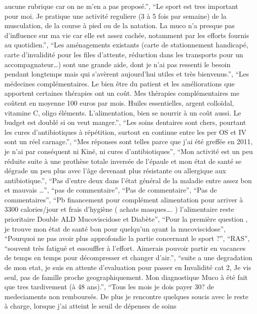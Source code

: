 \documentclass[
  letterpaper,
  DIV=11,
  numbers=noendperiod]{scrartcl}
\begin{document}
\begin{itemize}
  aucune rubrique car on ne m'en a pas proposé.'', ``Le sport est tres
  important pour moi. Je pratique une activité reguliere (3 à 5 fois par
  semaine) de la musculation, de la course à pied ou de la natation. La
  muco n'a presque pas d'influence sur ma vie car elle est assez cachée,
  notamment par les efforts fournis au quotidien.'', ``Les aménagements
  existants (carte de stationnement handicapé, carte d'invalidité pour
  les files d'attente, réduction dans les transports pour un
  accompagnateur\ldots) sont une grande aide, dont je n'ai pas ressenti
  le besoin pendant longtemps mais qui s'avèrent aujourd'hui utiles et
  très bienvenus.'', ``Les médecines complémentaires. Le bien être du
  patient et les améliorations que apportent certaines thérapies ont un
  coût. Mes thérapies complémentaires me coûtent en moyenne 100 euros
  par mois. Huiles essentielles, argent colloïdal, vitamine C, oligo
  éléments. L'alimentation, bien se nourrir à un coût aussi. Le budget
  est doublé si on veut manger.'', ``Les soins dentaires sont chers,
  pourtant les cures d'antibiotiques à répétition, surtout en continue
  entre les per OS et IV sont un réel carnage.'', ``Mes réponses sont
  telles parce que j'ai été greffée en 2011, je n'ai par conséquent ni
  Kiné, ni cures d'antibiotiques'', ``Mon activité est un peu réduite
  suite à une prothèse totale inversée de l'épaule et mon état de santé
  se dégrade un peu plus avec l'âge devenant plus résistante ou
  allergique aux antibiotique.'', ``Pas d'entre deux dans l'état général
  de la maladie entre assez bon et mauvais \ldots{}'', ``pas de
  commentaire'', ``Pas de commentaire'', ``Pas de commentaires'', ``Pb
  financement pour complément alimentation pour arriver à 3300
  calories/jour et frais d'hygiène ( achats masques\ldots. )
  l'alimentaire reste prioritaire Double ALD Mucoviscidose et Diabète'',
  ``Pour la première question , je trouve mon état de santé bon pour
  quelqu'un ayant la mucoviscidose'', ``Pourquoi ne pas avoir plus
  approfondie la partie concernant le sport ?'', ``RAS'', ``souvent très
  fatigué et essouffler à l'effort. Aimerais pouvoir partir en vacances
  de temps en temps pour décompresser et changer d'air.'', ``suite a une
  degradation de mon etat, je suis en attente d'evaluation pour passer
  en Invalidité cat 2, Je vis seul, pas de famille proche
  geographiquement. Mon diagnostique Muco à été fait que tres
  tardivement (à 48 ans).'', ``Tous les mois je dois payer 30? de
  medeciaments non remboursés. De plus je rencontre quelques soucis avec
  le reste à charge, lorsque j'ai atteint le seuil de dépenses de soins

\end{itemize}
\end{document}
